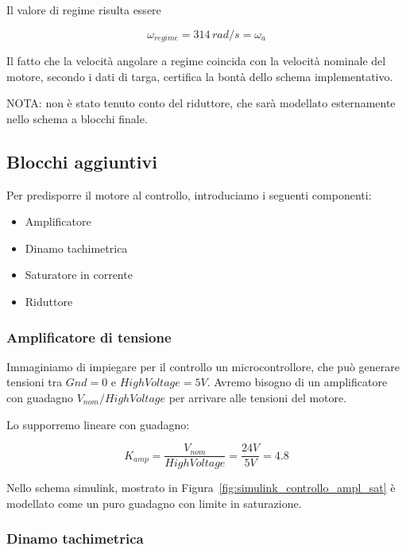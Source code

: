 \documentclass[a4paper,12pt]{article}
\begin{document}
\vspace{0.5cm}

Il valore di regime risulta essere 

\[
    \omega_{regime}= 314\,rad/s=\omega_a
\]
\vspace{0.3cm}

Il fatto che la velocità angolare a regime coincida con la velocità nominale del motore, secondo i dati di targa, certifica la bontà dello schema implementativo.

NOTA: non è stato tenuto conto del riduttore, che sarà modellato esternamente nello schema a blocchi finale.


\subsection{Blocchi aggiuntivi}


Per predisporre il motore al controllo, introduciamo i seguenti componenti:

\begin{itemize}
    \item Amplificatore
    \item Dinamo tachimetrica
    \item Saturatore in corrente
    \item Riduttore
\end{itemize}

\subsubsection{Amplificatore di tensione}

Immaginiamo di impiegare per il controllo un microcontrollore, che può generare tensioni tra $Gnd = 0$ e $HighVoltage = 5V$. Avremo bisogno di un amplificatore con guadagno $V_{nom}/HighVoltage$ per arrivare alle tensioni del motore.

Lo supporremo lineare con guadagno:

\vspace{0.3cm}

\[
    K_{amp} = \frac{V_{nom}}{HighVoltage} = \frac{24V}{5V}=4.8
\]


\vspace{0.5cm}

Nello schema simulink, mostrato in Figura~\ref{fig:simulink_controllo_ampl_sat} è modellato come un puro guadagno con limite in saturazione.


\subsubsection{Dinamo tachimetrica}
\end{document}
